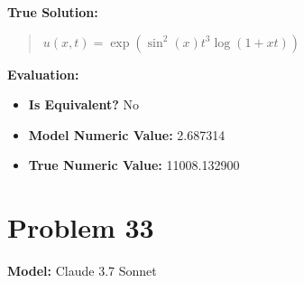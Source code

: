 \documentclass{article}
\begin{document}
\textbf{True Solution:}
\begin{quote}
$u(x,t) = \exp(\sin^2(x) t^3 \log(1 + xt))$
\end{quote}

\textbf{Evaluation:}
\begin{itemize}
\item \textbf{Is Equivalent?} No
\item \textbf{Model Numeric Value:} 2.687314
\item \textbf{True Numeric Value:} 11008.132900
\end{itemize}
\vspace{1cm}
\section*{Problem 33}
\textbf{Model:} Claude 3.7 Sonnet
\end{document}
